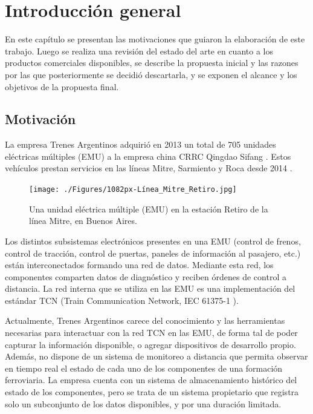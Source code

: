 \chapter{Introducción general}

En este capítulo se presentan las motivaciones que guiaron la elaboración de este trabajo. Luego se realiza una revisión del estado del arte en cuanto a los productos comerciales disponibles, se describe la propuesta inicial y las razones por las que posteriormente se decidió descartarla, y se exponen el alcance y los objetivos de la propuesta final.

\label{cap:IntroGeneral}

\section{Motivación}

La empresa Trenes Argentinos \cite{web:sofse} adquirió en 2013 un total de 705 unidades eléctricas múltiples (EMU) a la empresa china CRRC Qingdao Sifang \cite{web:sifang} \cite{licitacion1}. Estos vehículos prestan servicios en las líneas Mitre, Sarmiento y Roca desde 2014 \cite{emu:roca} \cite{emu:mitre-sarmiento}.


\begin{figure}[htbp]
	\centering
	\texttt{[image: ./Figures/1082px-Línea\_Mitre\_Retiro.jpg]}
	\caption[Unidad eléctrica múltiple (EMU)]{Una unidad eléctrica múltiple (EMU) en la estación Retiro de la línea Mitre, en Buenos Aires.\footnotemark}
	\label{fig:emu}
\end{figure}

Los distintos subsistemas electrónicos presentes en una EMU (control de frenos, control de tracción, control de puertas, paneles de información al pasajero, etc.) están interconectados formando una red de datos. Mediante esta red, los componentes comparten datos de diagnóstico y reciben órdenes de control a distancia. La red interna que se utiliza en las EMU es una implementación del estándar TCN (Train Communication Network, IEC 61375-1 \cite{iec61375-1}).

Actualmente, Trenes Argentinos carece del conocimiento y las herramientas necesarias para interactuar con la red TCN en las EMU, de forma tal de poder capturar la información disponible, o agregar dispositivos de desarrollo propio.
Además, no dispone de un sistema de monitoreo a distancia que permita observar en tiempo real el estado de cada uno de los componentes de una formación ferroviaria.
La empresa cuenta con un sistema de almacenamiento histórico del estado de los componentes, pero se trata de un sistema propietario que registra solo un subconjunto de los datos disponibles, y por una duración limitada.

